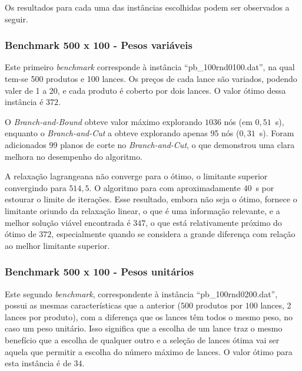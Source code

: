 \documentclass{article}
\begin{document}
    Os resultados para cada uma das instâncias escolhidas podem ser observados a seguir. 
    
    
    \subsubsection{Benchmark 500 x 100 - Pesos variáveis}%
    \label{sec:res:ssec:bchmrk1}
    
    Este primeiro \emph{benchmark} corresponde à instância \enquote{pb\_100rnd0100.dat}, na qual tem-se 500 produtos e 100 lances. Os preços de cada lance são variados, podendo valer de 1 a 20, e cada produto é coberto por dois lances. O valor ótimo dessa instância é $372$.
    
    O \emph{Branch-and-Bound} obteve valor máximo explorando $ 1036 $ nós (em $ 0{,}51 $~s), enquanto o \emph{Branch-and-Cut} a obteve explorando apenas 95 nós ($ 0{,}31 $~s). Foram adicionados 99 planos de corte no \emph{Branch-and-Cut}, o que demonstrou uma clara melhora no desempenho do algoritmo.
    
    A relaxação lagrangeana não converge para o ótimo, o limitante superior convergindo para $ 514{,}5 $. O algoritmo para com aproximadamente $40$~s por estourar o limite de iterações.  Esse resultado, embora não seja o ótimo, fornece o limitante oriundo da relaxação linear, o que é uma informação relevante, e a melhor solução viável encontrada é $347$, o que está relativamente próximo do ótimo de $372$, especialmente quando se considera a grande diferença com relação ao melhor limitante superior.
    
    
    \subsubsection{Benchmark 500 x 100 - Pesos unitários}
    
    Este segundo \emph{benchmark}, correspondente à instância \enquote{pb\_100rnd0200.dat}, possui as mesmas características que a anterior ($500$ produtos por $100$ lances, 2 lances por produto), com a diferença que os lances têm todos o mesmo peso, no caso um peso unitário. Isso significa que a escolha de um lance traz o mesmo benefício que a escolha de qualquer outro e a seleção de lances ótima vai ser aquela que permitir a escolha do número máximo de lances. O valor ótimo para esta instância é de $34$.
    
\end{document}
